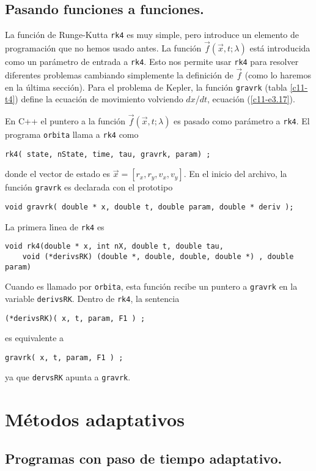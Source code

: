 \subsection{Pasando funciones a funciones.}

La funci{\'o}n de Runge-Kutta \verb|rk4| es muy simple, pero introduce un
elemento de programaci{\'o}n que no hemos usado antes. La funci{\'o}n $\vec
f(\vec x,t;\lambda)$ est{\'a} introducida como un par{\'a}metro de entrada a
\verb|rk4|.  Esto nos permite usar \verb|rk4| para resolver diferentes
problemas cambiando simplemente la definici{\'o}n de $\vec f$ (como lo
haremos en la {\'u}ltima secci{\'o}n). Para el problema de Kepler, la funci{\'o}n
\verb|gravrk| (tabla \ref{c11-t4}) define la ecuaci{\'o}n de movimiento
volviendo $dx$/$dt$, ecuaci{\'o}n (\ref{c11-e3.17}).

En C++ el puntero a la funci{\'o}n $\vec f(\vec x,t;\lambda)$ es pasado como
par{\'a}metro a \verb|rk4|. El programa \verb|orbita| llama a \verb|rk4|
como
\begin{verbatim}
rk4( state, nState, time, tau, gravrk, param) ;
\end{verbatim}
donde el vector de estado es $\vec x=[r_x, r_y, v_x, v_y]$. En el inicio
del archivo, la funci{\'o}n \verb|gravrk| es declarada con el prototipo
\begin{verbatim}
void gravrk( double * x, double t, double param, double * deriv );
\end{verbatim}
La primera l{\'\i}nea de \verb|rk4| es
\begin{verbatim}
void rk4(double * x, int nX, double t, double tau,
    void (*derivsRK) (double *, double, double, double *) , double param) 
\end{verbatim}
Cuando es llamado por \verb|orbita|, esta funci{\'o}n recibe un puntero a
\verb|gravrk| en la variable \verb|derivsRK|. Dentro de \verb|rk4|, la
sentencia 
\begin{verbatim}
(*derivsRK)( x, t, param, F1 ) ; 
\end{verbatim}
es equivalente a
\begin{verbatim}
gravrk( x, t, param, F1 ) ;
\end{verbatim}
ya que \verb|dervsRK| apunta a \verb|gravrk|.

\section{M{\'e}todos adaptativos}

\subsection{Programas con paso de tiempo adaptativo.}


